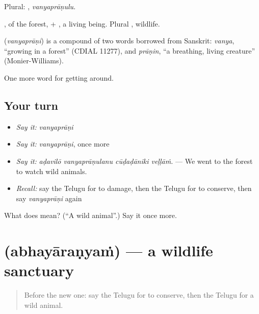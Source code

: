 Plural: , \emph{vanyaprāṇulu}.

, of the forest, + , a living being. Plural , wildlife.

\begin{cousinweb}
\textbf{} (\emph{vanyaprāṇi}) is a compound of two words borrowed from Sanskrit: \emph{vanya}, \textquotedblleft{}growing in a forest\textquotedblright{} (CDIAL 11277), and \emph{prāṇin}, \textquotedblleft{}a breathing, living creature\textquotedblright{} (Monier-Williams).
\end{cousinweb}

\begin{grammarlens}[title={What you've built}]
One more word for getting around.
\end{grammarlens}

\subsection*{Your turn}
\begin{itemize}
\raggedright
  \item \emph{Say it:} \emph{vanyaprāṇi}
  \item \emph{Say it:} \emph{vanyaprāṇi}, once more
  \item \emph{Say it:} \emph{aḍavilō vanyaprāṇulanu cūḍaḍāniki veḷḷāṁ.} — We went to the forest to watch wild animals.
  \item \emph{Recall:} say the Telugu for to damage, then the Telugu for to conserve, then say \emph{vanyaprāṇi} again
\end{itemize}

\begin{tcolorbox}[breakable,colback=teal!4,colframe=teal!35!black,title={Before you move on}]
What does  mean? (\textquotedblleft{}A wild animal\textquotedblright{}.) Say it once more.
\end{tcolorbox}
\section[\texorpdfstring{\te{అభయారణ్యం} (abhayāraṇyaṁ)}{అభయారణ్యం (abhayāraṇyaṁ)}]{ (abhayāraṇyaṁ) — a wildlife sanctuary}

\label{lesson:TE-C472-abhayaranyam}



\begin{quote}
Before the new one: say the Telugu for to conserve, then the Telugu for a wild animal.
\end{quote}

